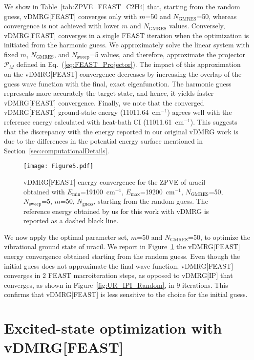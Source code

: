 \documentclass[journal=jctcce]{achemso}
\begin{document}
\noindent We show in Table~\ref{tab:ZPVE_FEAST_C2H4} that, starting from the random guess, vDMRG[FEAST] converges only with $m$=50 and $N_\text{GMRES}$=50, whereas convergence is not achieved with lower $m$ and $N_\text{GMRES}$ values.
Conversely, vDMRG[FEAST] converges in a single FEAST iteration when the optimization is initiated from the harmonic guess.
We approximately solve the linear system with fixed $m$, $N_\text{GMRES}$, and $N_\text{sweep}$=5 values,
and therefore, approximate the projector $\mathcal{P}_M$ defined in Eq.~(\ref{eq:FEAST_Projector}).
The impact of this approximation on the vDMRG[FEAST] convergence decreases by increasing the overlap of the guess wave function with the final, exact eigenfunction.
The harmonic guess represents more accurately the target state, and hence, it yields faster vDMRG[FEAST] convergence.
Finally, we note that the converged vDMRG[FEAST] ground-state energy (11011.64~cm$^{-1}$) agrees well with the reference energy calculated with heat-bath CI (11011.61~cm$^{-1}$).\cite{Berkelbach2021_HBCI-Vibrational}
This suggests that the discrepancy with the energy reported in our original vDMRG work\cite{Baiardi2017_VDMRG} is due to the differences in the potential energy surface mentioned in Section~\ref{sec:computationalDetails}.

\begin{figure}[htbp!]
  \centering
  \texttt{[image: Figure5.pdf]}
  \caption{vDMRG[FEAST] energy convergence for the ZPVE of uracil obtained with $E_\text{min}$=19100~cm$^{-1}$, $E_\text{max}$=19200~cm$^{-1}$, $N_\text{GMRES}$=50, $N_\text{sweep}$=5, $m$=50, $N_\text{guess}$, starting from the random guess.
  The reference energy obtained by us for this work with vDMRG is reported as a dashed black line.}
  \label{fig:Uracil_ZPVE_FEAST}
\end{figure}
%
\noindent We now apply the optimal parameter set, $m$=50 and $N_\text{GMRES}$=50, to optimize the vibrational ground state of uracil.
We report in Figure~\ref{fig:Uracil_ZPVE_FEAST} the vDMRG[FEAST] energy convergence obtained starting from the random guess.
Even though the initial guess does not approximate the final wave function, vDMRG[FEAST] converges in 2 FEAST macroiteration steps, as opposed to vDMRG[IP] that converges, as shown in Figure~\ref{fig:UR_IPI_Random}, in 9 iterations.
This confirms that vDMRG[FEAST] is less sensitive to the choice for the initial guess.


\section{Excited-state optimization with vDMRG[FEAST]}
\end{document}
